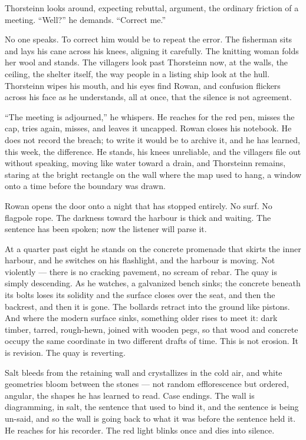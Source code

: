 \documentclass[11pt,oneside]{book}
\newcommand{\sceneline}{%
  \par\vspace{1.2em}
  \begin{center}
    \fontsize{11}{11}\selectfont \textbullet\quad\textbullet\quad\textbullet
  \end{center}
  \vspace{0.6em}\noindent\ignorespaces
}
\begin{document}
Thorsteinn looks around, expecting rebuttal, argument, the ordinary
friction of a meeting. ``Well?'' he demands. ``Correct me.''

No one speaks. To correct him would be to repeat the error. The
fisherman sits and lays his cane across his knees, aligning it
carefully. The knitting woman folds her wool and stands. The villagers
look past Thorsteinn now, at the walls, the ceiling, the shelter itself,
the way people in a listing ship look at the hull. Thorsteinn wipes his
mouth, and his eyes find Rowan, and confusion flickers across his face
as he understands, all at once, that the silence is not agreement.

``The meeting is adjourned,'' he whispers. He reaches for the red pen,
misses the cap, tries again, misses, and leaves it uncapped. Rowan
closes his notebook. He does not record the breach; to write it would be
to archive it, and he has learned, this week, the difference. He stands,
his knees unreliable, and the villagers file out without speaking,
moving like water toward a drain, and Thorsteinn remains, staring at the
bright rectangle on the wall where the map used to hang, a window onto a
time before the boundary was drawn.

\sceneline

Rowan opens the door onto a night that has stopped entirely. No surf. No
flagpole rope. The darkness toward the harbour is thick and waiting. The
sentence has been spoken; now the listener will parse it.

At a quarter past eight he stands on the concrete promenade that skirts
the inner harbour, and he switches on his flashlight, and the harbour is
moving. Not violently --- there is no cracking pavement, no scream of
rebar. The quay is simply descending. As he watches, a galvanized bench
sinks; the concrete beneath its bolts loses its solidity and the surface
closes over the seat, and then the backrest, and then it is gone. The
bollards retract into the ground like pistons. And where the modern
surface sinks, something older rises to meet it: dark timber, tarred,
rough-hewn, joined with wooden pegs, so that wood and concrete occupy
the same coordinate in two different drafts of time. This is not
erosion. It is revision. The quay is reverting.

Salt bleeds from the retaining wall and crystallizes in the cold air,
and white geometries bloom between the stones --- not random
efflorescence but ordered, angular, the shapes he has learned to read.
Case endings. The wall is diagramming, in salt, the sentence that used
to bind it, and the sentence is being un-said, and so the wall is going
back to what it was before the sentence held it. He reaches for his
recorder. The red light blinks once and dies into silence.
\end{document}
